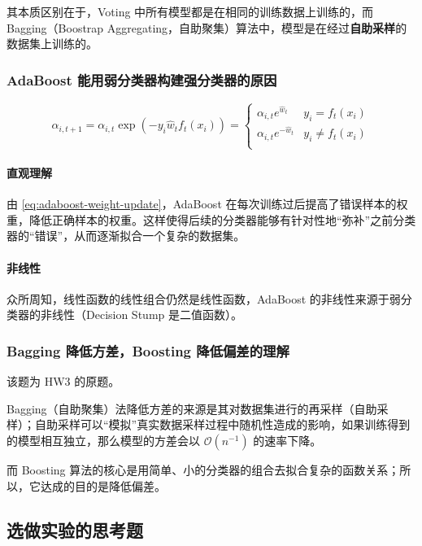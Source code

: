 \documentclass[oneside]{ctexbook}
\begin{document}
其本质区别在于，Voting 中所有模型都是在相同的训练数据上训练的，而 Bagging（Boostrap Aggregating，自助聚集）算法中，模型是在经过{\bf 自助采样}的数据集上训练的。

\subsubsection{AdaBoost 能用弱分类器构建强分类器的原因}

\begin{equation}
    \alpha_{i,t+1} = \alpha_{i,t}\exp\left( -y_i\hat{w}_tf_t(x_i) \right)
    = \begin{cases}
        \alpha_{i, t} e^{\hat{w}_t} & y_i = f_t(x_i) \\
        \alpha_{i, t} e^{-\hat{w}_t} & y_i \ne f_t(x_i) \\
    \end{cases}
    \label{eq:adaboost-weight-update}
\end{equation}

\paragraph{直观理解}由 \eqref{eq:adaboost-weight-update}，AdaBoost 在每次训练过后提高了错误样本的权重，降低正确样本的权重。这样使得后续的分类器能够有针对性地“弥补”之前分类器的“错误”，从而逐渐拟合一个复杂的数据集。

\paragraph{非线性}众所周知，线性函数的线性组合仍然是线性函数，AdaBoost 的非线性来源于弱分类器的非线性（Decision Stump 是二值函数）。

\subsubsection{Bagging 降低方差，Boosting 降低偏差的理解}

该题为 HW3 的原题。

Bagging（自助聚集）法降低方差的来源是其对数据集进行的再采样（自助采样）；自助采样可以“模拟”真实数据采样过程中随机性造成的影响，如果训练得到的模型相互独立，那么模型的方差会以 $\mathcal O(n^{-1})$ 的速率下降。

而 Boosting 算法的核心是用简单、小的分类器的组合去拟合复杂的函数关系；所以，它达成的目的是降低偏差。

\subsection{选做实验的思考题}
\end{document}
